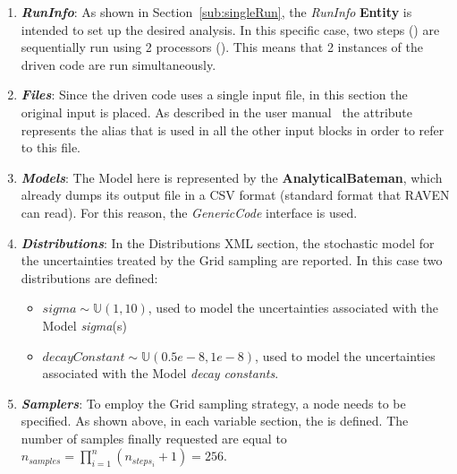 \begin{enumerate}
   \item \textbf{\textit{RunInfo}}:
   As shown in Section~\ref{sub:singleRun}, the \textit{RunInfo} \textbf{Entity} is intended to set up the desired analysis.
   In this specific case, two steps () are sequentially run
   using 2 processors (). This means that
   2 instances of the driven code are  run simultaneously.
   \item \textbf{\textit{Files}}:
   Since the driven code uses a single input file, in this section the original input is placed. As described in the user manual~\cite{RAVENuserManual}
   the attribute   represents the alias that is used in all the other input blocks in order to refer to this file.
   \item \textbf{\textit{Models}}:
 The Model here is represented by the
 \textbf{AnalyticalBateman}, which already dumps its output file in a
 CSV format (standard format that RAVEN can read). For this reason,
 the \textit{GenericCode} interface is used.
   \item \textbf{\textit{Distributions}}:
  In the Distributions XML section, the stochastic model for the
  uncertainties  treated by the Grid sampling are reported. In
  this case two distributions are defined:
  \begin{itemize}
    \item $sigma \sim \mathbb{U}(1,10)$, used to model the uncertainties
    associated with  the Model \textit{sigma}(s)
    \item  $decayConstant \sim \mathbb{U}(0.5e-8,1e-8)$,  used to
    model the uncertainties
    associated with  the Model \textit{decay constants}.
  \end{itemize}
   \item \textbf{\textit{Samplers}}:
  To employ the Grid sampling strategy, a
   node needs to be specified. As shown above, in each variable section, the   is defined.
  The number of samples finally requested are equal to $n_{samples} = \prod_{i=1}^{n} (n_{steps_{i}} +1)= 256$.

\end{enumerate}
